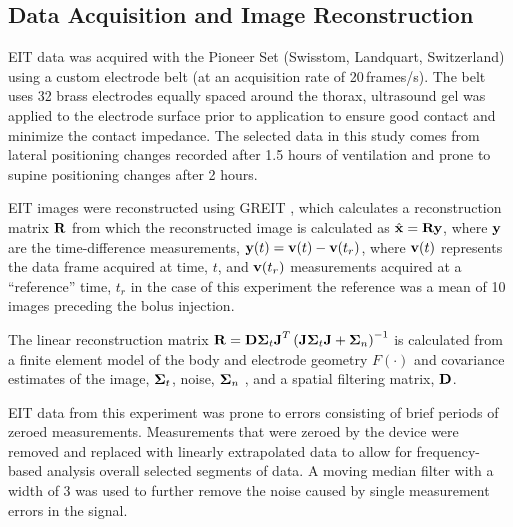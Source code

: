 \subsection{Data Acquisition and Image Reconstruction}

EIT data was acquired with the Pioneer Set (Swisstom, Landquart, Switzerland)
using a custom electrode belt (at an acquisition rate of 20\,frames/s).
The belt uses 32 brass electrodes equally spaced around the thorax, 
ultrasound gel was applied to the electrode surface prior to 
application to ensure good contact and minimize the contact impedance. 
The selected data in this study comes from lateral positioning changes recorded after 1.5 hours of ventilation and prone to supine positioning changes after 
2 hours.

EIT images were 
reconstructed using GREIT \parencite{adler_greit_2009}, %
which
calculates a reconstruction matrix $\mathbf{R}$ from which
the reconstructed image is calculated as $\hat{\mathbf{x}} = \mathbf{R} \mathbf{y}$,
where $\mathbf{y}$ are the time-difference
measurements,
$\mathbf{y}(t) = {\mbox{\bf v}}(t) - {\mbox{\bf v}}(t_r)$,
where ${\mbox{\bf v}}(t)$ represents 
the data frame acquired at time, $t$,
and ${\mbox{\bf v}}(t_r)$ measurements acquired at a 
``reference'' time, $t_r$ 
in the case of this experiment the reference was
a mean of 10 images preceding the bolus injection.

The linear reconstruction matrix $\mathbf{R}
 = \mathbf{D} \boldsymbol{\Sigma}_t {\mbox{\bf J}}^T 
    \left(
       {\mbox{\bf J}} \boldsymbol{\Sigma}_t {\mbox{\bf J}} + \boldsymbol{\Sigma}_n
    \right)^{-1}
$ is calculated from a
finite element model of the body and electrode geometry
$F(\cdot)$ and covariance estimates of the image, $\boldsymbol{\Sigma}_t$, 
noise, $\boldsymbol{\Sigma}_n$ \parencite{grychtol_3d_2016}, %
and
a spatial filtering matrix, $\mathbf{D}$.

EIT data from this experiment was prone to errors consisting of brief 
periods of zeroed measurements. 
Measurements that were zeroed by the device were removed and replaced with linearly  
extrapolated data to allow for frequency-based analysis overall selected segments
of data.
A moving median filter with a width of 3 was used to further remove the
noise caused by single measurement errors in the signal.

%


